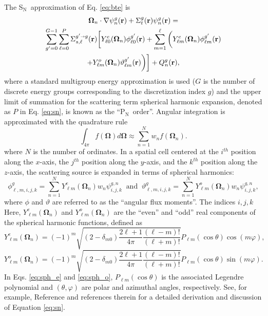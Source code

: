 \documentclass{article} %
\newcommand{\sa}{\shortrightarrow}
\newcommand{\bo}{\mathbf\Omega}
\newcommand{\vecr}{\textbf{r}}
\newcommand{\sn}{S$_\mathrm{N}$}
\newcommand{\pn}{P$_\mathrm{N}$}
\newcommand{\Ye}[2]{\ensuremath{Y^e_{#1}(\bo_#2)}}
\newcommand{\Yo}[2]{\ensuremath{Y^o_{#1}(\bo_#2)}}
\begin{document}
The \sn\ approximation of Eq. \eqref{eq:bte} is
%
\begin{multline}
\bo_n \cdot \nabla \psi_n^g(\vecr) + \Sigma_t^g(\vecr)\psi_n^g(\vecr) = \\
\sum_{g'=0}^{G-1}\sum_{\ell=0}^{P}\Sigma_{s,\ell}^{g'\sa g}(\vecr)
\bigg[\Ye{\ell 0}{n}\phi_{\ell 0}^{g'}(\vecr) + \sum_{m=1}^{\ell}
\bigg(\Ye{\ell m}{n}\phi_{\ell m}^{g'}(\vecr) \\
 + \Yo{\ell m}{n}\vartheta_{\ell m}^{g'}(\vecr)\bigg)\bigg]
+ Q_n^g(\vecr),
\label{eq:sn}
\end{multline}
%
where a standard multigroup energy approximation is used ($G$ is the
number of discrete energy groups corresponding to the discretization index
$g$) and the  upper limit of summation for the scattering term spherical
harmonic expansion, denoted as $P$ in Eq. \eqref{eq:sn}, is known as the
``\pn\ order''. Angular integration is approximated with the quadrature rule 
%
\begin{equation}
\int_{4\pi} f\left(\bo\right) d\bo \approx \sum_{n=1}^{N}w_n f\left(\bo_n\right).
\label{eq:quadrule}
\end{equation}
%
where $N$ is the number of ordinates. In a spatial cell centered at the
$i^{th}$ position along the $x$-axis, the $j^{th}$ position along the
$y$-axis, and the $k^{th}$ position along the $z$-axis, the scattering
source is expanded in terms of spherical harmonics:
%
\begin{equation}
\phi_{\ell,m,i,j,k}^{g}=\sum_{n=1}^N \Ye{\ell m}{n}w_n\psi^{g,n}_{i,j,k}\ \text{ and }\
\vartheta_{\ell,m,i,j,k}^{g} = \sum_{n=1}^N \Yo{\ell m}{n}w_n\psi^{g,n}_{i,j,k},
\label{sph_harm_exp}
\end{equation}
%
where $\phi$ and $\vartheta$ are referred to as the ``angular flux
moments''. The indices $i,j,k$ 
Here, $\Ye{\ell m}{n}$ and $\Yo{\ell m}{n}$ are the ``even'' and
``odd'' real components of the spherical harmonic functions, defined as
\cite{exmm}
%
\begin{equation}
\Ye{\ell m}{n} = (-1)^m\sqrt{(2-\delta_{m0})\frac{2\ell+1}{4\pi}
                       \frac{(\ell-m)!}{(\ell+m)!}}
                       P_{\ell m}(\cos\theta)\cos(m\varphi),
\label{eq:sph_e}
\end{equation}
\begin{equation}
\Yo{\ell m}{n} = (-1)^m\sqrt{(2-\delta_{m0})\frac{2\ell+1}{4\pi}
                       \frac{(\ell-m)!}{(\ell+m)!}}
                       P_{\ell m}(\cos\theta)\sin(m\varphi).
\label{eq:sph_o}
\end{equation}
%
In Eqs. \eqref{eq:sph_e} and \eqref{eq:sph_o},
$P_{\ell m}(\cos\theta)$ is the associated Legendre polynomial and
$(\theta,\varphi)$ are polar and azimuthal angles, respectively. 
See, for example, Reference \cite{denovo} and references therein for a
detailed derivation  and discussion of Equation \eqref{eq:sn}.
\end{document}
